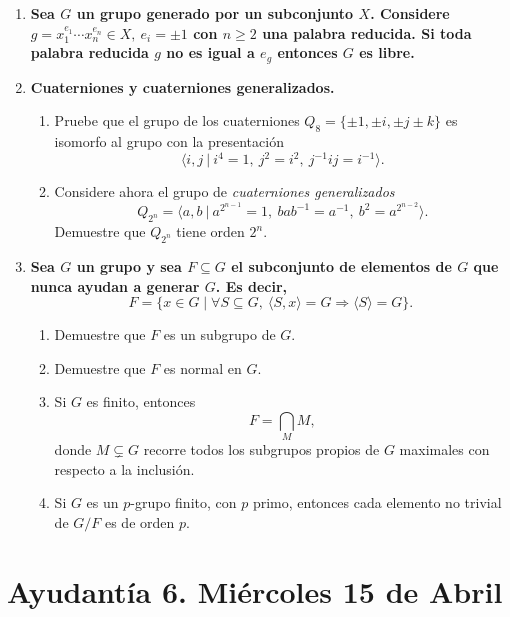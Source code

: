 \documentclass{article}
\theoremstyle{definition}
\theoremstyle{remark}
\numberwithin{equation}{section}
\begin{document}
\begin{enumerate}
\item \textbf{Sea $G$ un grupo generado por un subconjunto $X$. Considere $g=x_1^{e_1} \cdots x_n^{e_n} \in X, \ e_i=\pm 1$ con $n\geq 2$ una palabra reducida. Si toda palabra reducida $g$ no es igual a $e_g$ entonces $G$ es libre.}

\item \textbf{Cuaterniones y cuaterniones generalizados.}
\begin{enumerate}
\item Pruebe que el grupo de los cuaterniones $Q_8 = \{ \pm 1, \pm i, \pm j \pm k\}$ es isomorfo al grupo con la presentación $$ \langle  i,j \ | \ i^4=1, \  j^2=i^2, \ j^{-1}ij=i^{-1} \rangle.$$
\item Considere ahora el grupo de \textit{cuaterniones generalizados}
$$Q_{2^n}=\langle a,b \ |\ a^{2^{n-1}}=1, \ bab^{-1}=a^{-1}, \ b^2=a^{2^{n-2}} \rangle.$$ Demuestre que $Q_{2^n}$ tiene orden $2^n$.
\end{enumerate}


\item \textbf{Sea $G$ un grupo y sea $F \subseteq G$ el subconjunto de elementos de $G$ que nunca ayudan a generar $G$. Es decir,
\[
F = \{x \in G \mid \forall S \subseteq G,\ \langle S, x \rangle = G \Rightarrow \langle S \rangle = G \}.
\]
}
\begin{enumerate}
\item Demuestre que $F$ es un subgrupo de $G$.
\item Demuestre que $F$ es normal en $G$.
\item Si $G$ es finito, entonces
\[
F = \bigcap_{M} M,
\]
donde $M \subsetneq G$ recorre todos los subgrupos propios de $G$ maximales con respecto a la inclusión.
\item Si $G$ es un $p$-grupo finito, con $p$ primo, entonces cada elemento no trivial de $G/F$ es de orden $p$.
\end{enumerate}

\end{enumerate}



\newpage
\section{Ayudantía 6. Miércoles 15 de Abril}
\end{document}

